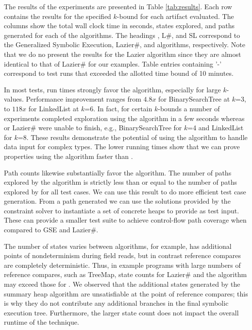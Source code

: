 The results of the experiments are presented in Table
\ref{tab:results}. Each row contains the results for the specified $k$-bound 
for each artifact evaluated. The columns show the total
wall clock time in seconds, states explored, and paths generated for
each of the algorithms. The headings \gsetxt{}, L\#, and SL correspond
to the Generalized Symbolic Execution, Lazier\#, and \symtxt{}
algorithms, respectively. Note that we do no present the results for
the Lazier algorithm since they are almost identical to that of Lazier\#
for our examples. Table entries containing '-' correspond to test runs
that exceeded the allotted time bound of 10 minutes.

In most tests, run times strongly favor the \symtxt{} algorithm, especially for
large $k$-values. Performance improvement ranges from $4.8x$ for
BinarySearchTree at $k$=3, to $118x$ for LinkedList at $k$=6. In fact,
for certain $k$-bounds a number of experiments completed exploration
using the \symtxt{} algorithm in a few seconds whereas \gsetxt{} or Lazier\# were
unable to finish, e.g., BinarySearchTree for $k$=4 and LinkedList for
$k$=8. These results demonstrate the potential of using the \symtxt{} algorithm 
to handle data input for complex types. The lower running times
show that we can prove properties using the \symtxt{} algorithm faster than
\gsetxt{}.


Path counts likewise substantially favor the \symtxt{} algorithm. The number of
paths explored by the algorithm is strictly less than or equal to the number
of paths explored by \gsetxt{} for all test cases. We can use this
result to do more efficient test case generation. From a path
generated we can use the solutions provided by the constraint solver
to instantiate a set of concrete heaps to provide as test input. These
can provide a smaller test suite to achieve control-flow path coverage when
compared to GSE and Lazier\#.



The number of states varies between algorithms, for example, \gsetxt{}
has additional points of nondeterminism during field reads, but in
contrast reference compares are completely deterministic. Thus, in
example programs with large numbers of reference compares, such as
TreeMap, state counts for Lazier\# and the \symtxt{} algorithm may
exceed those for \gsetxt{}. We observed that the additional states
generated by the summary heap algorithm are unsatisfiable at the point
of reference compares; this is why they do not contribute any
additional branches in the final symbolic execution tree. Furthermore,
the larger state count does not impact the overall runtime of the
technique.


